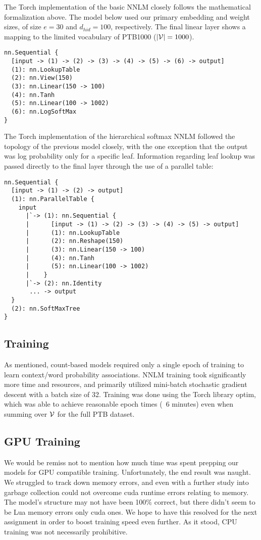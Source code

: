 \documentclass[11pt]{article}
\begin{document}
The Torch implementation of the basic NNLM closely follows the mathematical formalization above. The model below used our primary embedding and weight sizes, of size $e=30$ and $d_{hid} = 100$, respectively. The final linear layer shows a mapping to the limited vocabulary of PTB1000 ($|\mathcal{V}| = 1000$).
\begin{verbatim}
nn.Sequential {
  [input -> (1) -> (2) -> (3) -> (4) -> (5) -> (6) -> output]
  (1): nn.LookupTable
  (2): nn.View(150)
  (3): nn.Linear(150 -> 100)
  (4): nn.Tanh
  (5): nn.Linear(100 -> 1002)
  (6): nn.LogSoftMax
}
\end{verbatim}

The Torch implementation of the hierarchical softmax NNLM followed the topology of the previous model closely, with the one exception that the output was log probability only for a specific leaf. Information regarding leaf lookup was passed directly to the final layer through the use of a parallel table:
\begin{verbatim}
nn.Sequential {
  [input -> (1) -> (2) -> output]
  (1): nn.ParallelTable {
    input
      |`-> (1): nn.Sequential {
      |      [input -> (1) -> (2) -> (3) -> (4) -> (5) -> output]
      |      (1): nn.LookupTable
      |      (2): nn.Reshape(150)
      |      (3): nn.Linear(150 -> 100)
      |      (4): nn.Tanh
      |      (5): nn.Linear(100 -> 1002)
      |    }
      |`-> (2): nn.Identity
       ... -> output
  }
  (2): nn.SoftMaxTree
}
\end{verbatim}

\subsection{Training}
As mentioned, count-based models required only a single epoch of training to learn context/word probability associations. NNLM training took significantly more time and resources, and primarily utilized mini-batch stochastic gradient descent with a batch size of 32. Training was done using the Torch library optim, which was able to achieve reasonable epoch times (~6 minutes) even when summing over $\mathcal{V}$ for the full PTB dataset.

\subsection{GPU Training}
We would be remiss not to mention how much time was spent prepping our models for GPU compatible training. Unfortunately, the end result was naught. We struggled to track down memory errors, and even with a further study into garbage collection could not overcome cuda runtime errors relating to memory. The model's structure may not have been 100\% correct, but there didn't seem to be Lua memory errors \textemdash  only cuda ones. We hope to have this resolved for the next assignment in order to boost training speed even further. As it stood, CPU training was not necessarily prohibitive.
\end{document}
